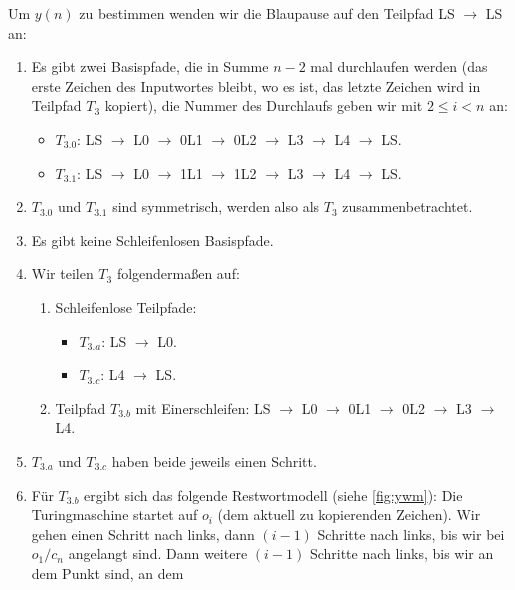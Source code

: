 Um $y(n)$ zu bestimmen wenden wir die Blaupause auf den Teilpfad LS $\rightarrow$ LS an:

\begin{enumerate}
    \item Es gibt zwei Basispfade, die in Summe $n-2$ mal durchlaufen werden (das erste Zeichen des Inputwortes bleibt, wo es ist, das letzte Zeichen wird in Teilpfad $T_3$ kopiert),
        die Nummer des Durchlaufs geben wir mit $2 \leq i < n$ an:
        \begin{itemize}
                \item $T_{3.0}$: LS $\rightarrow$ L0 $\rightarrow$ 0L1 $\rightarrow$ 0L2 $\rightarrow$ L3 $\rightarrow$ L4 $\rightarrow$ LS.\\
                \item $T_{3.1}$: LS $\rightarrow$ L0 $\rightarrow$ 1L1 $\rightarrow$ 1L2 $\rightarrow$ L3 $\rightarrow$ L4 $\rightarrow$ LS.\\
        \end{itemize}
    \item $T_{3.0}$ und $T_{3.1}$ sind symmetrisch, werden also als $T_{3}$ zusammenbetrachtet.
    \item Es gibt keine Schleifenlosen Basispfade. 
    \item Wir teilen $T_3$ folgendermaßen auf:
        \begin{enumerate}
            \item Schleifenlose Teilpfade:
                \begin{itemize}
                    \item $T_{3.a}$: LS $\rightarrow$ L0.
                    \item $T_{3.c}$: L4 $\rightarrow$ LS.\@
                \end{itemize}
            \item Teilpfad $T_{3.b}$ mit Einerschleifen: LS $\rightarrow$ L0 $\rightarrow$ 0L1 $\rightarrow$ 0L2 $\rightarrow$ L3 $\rightarrow$ L4.\\
        \end{enumerate}
    \item $T_{3.a}$ und $T_{3.c}$ haben beide jeweils einen Schritt.
    \item Für $T_{3.b}$ ergibt sich das folgende Restwortmodell (siehe \autoref{fig:ywm}):
        Die Turingmaschine  startet auf $o_i$ (dem aktuell zu kopierenden Zeichen).
        Wir gehen einen Schritt nach links,
        dann $(i-1)$ Schritte nach links, bis wir bei $o_1/c_{n}$ angelangt sind.
        Dann weitere $(i-1)$ Schritte nach links, bis wir an dem Punkt sind, an dem

\end{enumerate}
